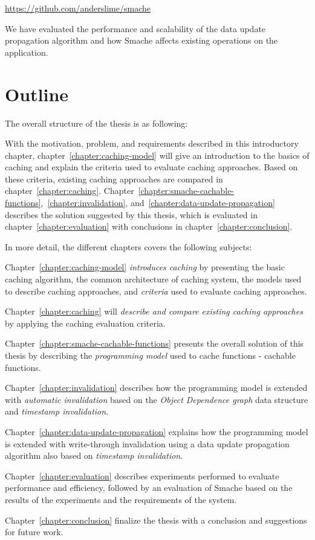 \url{https://github.com/anderslime/smache}

We have evaluated the performance and scalability of the data update propagation algorithm and how Smache affects existing operations on the application.

\section{Outline}
\label{sec:outline}

The overall structure of the thesis is as following:

With the motivation, problem, and requirements described in this introductory chapter, chapter~\ref{chapter:caching-model} will give an introduction to the basics of caching and explain the criteria used to evaluate caching approaches. Based on these criteria, existing caching approaches are compared in chapter~\ref{chapter:caching}. Chapter~\ref{chapter:smache-cachable-functions},~\ref{chapter:invalidation}, and~\ref{chapter:data-update-propagation} describes the solution suggested by this thesis, which is evaluated in chapter~\ref{chapter:evaluation} with conclusions in chapter~\ref{chapter:conclusion}.

In more detail, the different chapters covers the following subjects:

Chapter~\ref{chapter:caching-model} \emph{introduces caching} by presenting the basic caching algorithm, the common architecture of caching system, the models used to describe caching approaches, and \emph{criteria} used to evaluate caching approaches.

Chapter~\ref{chapter:caching} will \emph{describe and compare existing caching approaches} by applying the caching evaluation criteria.

Chapter~\ref{chapter:smache-cachable-functions} presents the overall solution of this thesis by describing the \emph{programming model} used to cache functions - cachable functions.

Chapter~\ref{chapter:invalidation} describes how the programming model is extended with \emph{automatic invalidation} based on the \emph{Object Dependence graph} data structure and \emph{timestamp invalidation}.

Chapter~\ref{chapter:data-update-propagation} explains how the programming model is extended with write-through invalidation using a data update propagation algorithm also based on \emph{timestamp invalidation}.

Chapter~\ref{chapter:evaluation} describes experiments performed to evaluate performance and efficiency, followed by an evaluation of Smache based on the results of the experiments and the requirements of the system.

Chapter~\ref{chapter:conclusion} finalize the thesis with a conclusion and suggestions for future work.




